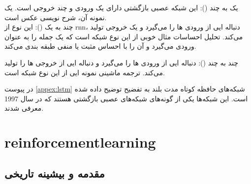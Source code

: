% 
 یک به چند (): این شبکه عصبی بازگشتی دارای یک ورودی و چند خروجی است. یک نمونه آن، شرح نویسی عکس است.
\\

 چند به یک (): این نوع از \gls{rnn}، دنباله ایی از ورودی ها را می‌گیرد و یک خروجی تولید می‌کند. تحلیل احساسات مثال خوبی از این نوع شبکه است که یک جمله را به عنوان ورودی می‌گیرد و آن را با احساس مثبت یا منفی طبقه بندی می‌کند.

%
 
 چند به چند (): دنباله ایی از ورودی ها را می‌گیرد و دنباله ایی از خروجی ها را تولید می‌کند. ترجمه ماشینی نمونه ایی از این نوع شبکه است.

در پیوست \ref{appex:lstm} شبکه‌های حافظه کوتاه مدت بلند به تفضیح توضیح داده شده است. این شبکه‌ها یکی از گونه‌های شبکه‌های عصبی بازگشتی هستند که در سال 1997 معرفی شدند.

 \section{\gls{reinforcementlearning}}
 
 \subsection{مقدمه و بیشینه تاریخی}
 
